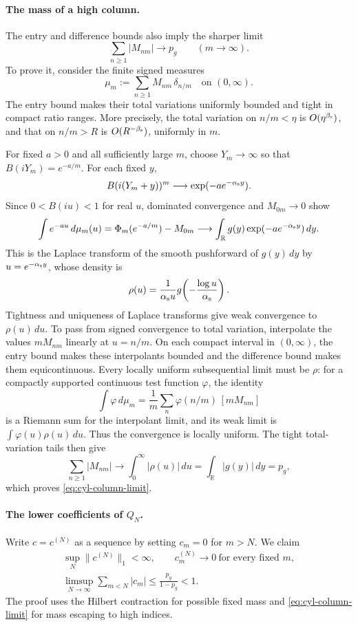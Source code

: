 \paragraph{The mass of a high column.}
The entry and difference bounds also imply the sharper limit
\begin{equation}\label{eq:cyl-column-limit}
 \sum_{n\ge1}|M_{nm}|\longrightarrow p_g
 \qquad(m\to\infty).
\end{equation}
To prove it, consider the finite signed measures
\[
 \mu_m:=\sum_{n\ge1}M_{nm}\,\delta_{n/m}
 \quad\text{on }(0,\infty).
\]
The entry bound makes their total variations uniformly bounded and
tight in compact ratio ranges.  More precisely, the total variation
on \(n/m<\eta\) is \(O(\eta^{\beta_{\rm s}})\), and that on
\(n/m>R\) is \(O(R^{-\beta_{\rm s}})\), uniformly in \(m\).

For fixed \(a>0\) and all sufficiently large \(m\), choose
\(Y_m\to\infty\) so that
\(B(iY_m)=e^{-a/m}\).  For each fixed \(y\),
\[
 B(i(Y_m+y))^m\longrightarrow
       \exp(-a e^{-\alpha_{\rm s}y}).
\]
Since \(0<B(iu)<1\) for real \(u\), dominated convergence and
\(M_{0m}\to0\) show
\[
 \int e^{-au}\,d\mu_m(u)
 =\Phi_m(e^{-a/m})-M_{0m}
 \longrightarrow
 \int_{\mathbb R}g(y)\exp(-a e^{-\alpha_{\rm s}y})\,dy.
\]
This is the Laplace transform of the smooth pushforward of
\(g(y)\,dy\) by \(u=e^{-\alpha_{\rm s}y}\), whose density is
\[
 \rho(u)=\frac1{\alpha_{\rm s}u}
         g\!\left(-\frac{\log u}{\alpha_{\rm s}}\right).
\]
Tightness and uniqueness of Laplace transforms give weak convergence
to \(\rho(u)\,du\).  To pass from signed convergence to total
variation, interpolate the values \(mM_{nm}\) linearly at \(u=n/m\).
On each compact interval in \((0,\infty)\), the entry bound makes
these interpolants bounded and the difference bound makes them
equicontinuous.  Every locally uniform subsequential limit must be
\(\rho\): for a compactly supported continuous test function
\(\varphi\), the identity
\[
 \int\varphi\,d\mu_m
 =\frac1m\sum_n\varphi(n/m)\,[mM_{nm}]
\]
is a Riemann sum for the interpolant limit, and its weak limit is
\(\int\varphi(u)\rho(u)\,du\).  Thus the convergence is locally uniform.
The tight total-variation tails then give
\[
 \sum_{n\ge1}|M_{nm}|\longrightarrow
 \int_0^\infty|\rho(u)|\,du=\int_{\mathbb R}|g(y)|\,dy=p_g,
\]
which proves \eqref{eq:cyl-column-limit}.

\paragraph{The lower coefficients of \(Q_N\).}
Write \(c=c^{(N)}\) as a sequence by setting \(c_m=0\) for \(m>N\).
We claim
\begin{equation}\label{eq:cyl-c-margin}
\begin{gathered}
 \sup_N\|c^{(N)}\|_1<\infty,\qquad
 c_m^{(N)}\longrightarrow0\ \text{for every fixed }m,\\
 \limsup_{N\to\infty}\sum_{m<N}|c_m|
       \le\frac{p_g}{1-p_g}<1.
\end{gathered}
\end{equation}
The proof uses the Hilbert contraction for possible fixed mass and
\eqref{eq:cyl-column-limit} for mass escaping to high indices.

